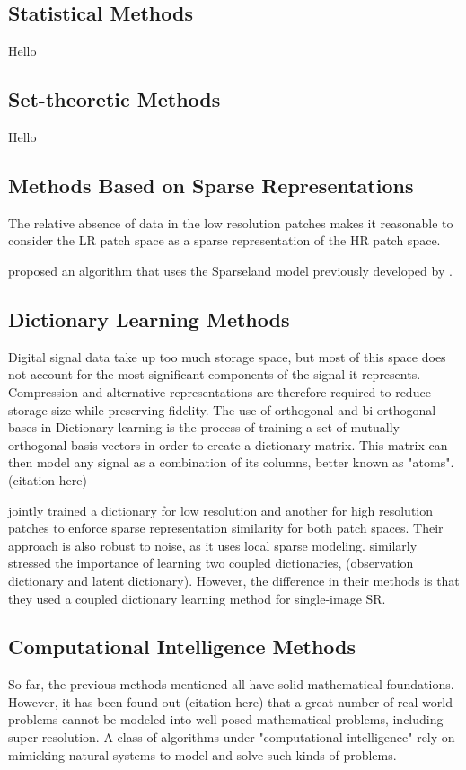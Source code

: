 \citep{Yang2010}

\subsection{Statistical Methods}
Hello
\citep{Yang2010a}

\subsection{Set-theoretic Methods}
Hello
\citep{Yang2010a}

\subsection{Methods Based on Sparse Representations}
The relative absence of data in the low resolution patches makes it reasonable to consider the LR patch space as a sparse representation of the HR patch space.

\cite{Zeyde2012} proposed an algorithm that uses the Sparseland model previously developed by \cite{Elad2006}.
\subsection{Dictionary Learning Methods}
Digital signal data take up too much storage space, but most of this space does not account for the most significant components of the signal it represents.
Compression and alternative representations are therefore required to reduce storage size while preserving fidelity.
The use of orthogonal and bi-orthogonal bases in 
Dictionary learning is the process of training a set of mutually orthogonal basis vectors in order to create a dictionary matrix. 
This matrix can then model any signal as a combination of its columns, better known as "atoms". (citation here)

\cite{Wright2010} jointly trained a dictionary for low resolution and another for high resolution patches to enforce sparse representation similarity for both patch spaces. Their approach is also robust to noise, as it uses local sparse modeling.
\cite{Yang2012} similarly stressed the importance of learning two coupled dictionaries, (observation dictionary and latent dictionary). However, the difference in their methods is that they used a coupled dictionary learning method for single-image SR. 	


\subsection{Computational Intelligence Methods}
So far, the previous methods mentioned all have solid mathematical foundations.
However, it has been found out (citation here) that a great number of real-world problems cannot be modeled into well-posed mathematical problems, including super-resolution.
A class of algorithms under "computational intelligence" rely on mimicking natural systems to model and solve such kinds of problems.


